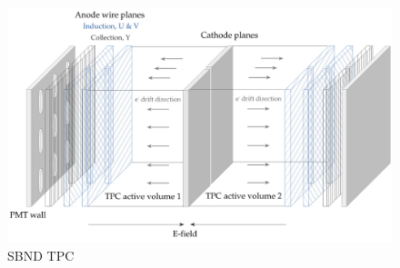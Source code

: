     \begin{figure}[h!]
        \center
        \includegraphics[width=\textwidth]{images/SBND_TPC.pdf}
        \caption{SBND TPC}
        \label{fig:sbndtpc}
    \end{figure}
    
    
 \clearpage
